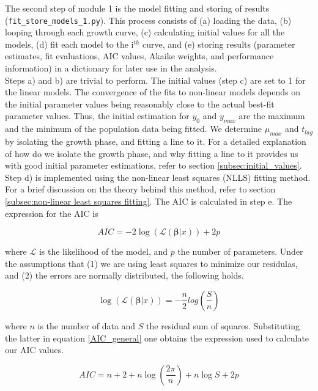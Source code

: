 \documentclass[titlepage,11pt]{article}
\begin{document}
\begin{linenumbers}
		The second step of module 1 is the model fitting and storing of results (\verb|fit_store_models_1.py|). This process consists of (a) loading the data, (b) looping through each growth curve, (c) calculating initial values for all the models, (d) fit each model to the i$ ^{th} $ curve, and (e) storing results (parameter estimates, fit evaluations, AIC values, Akaike weights, and performance information) in a dictionary for later use in the analysis. \\
		Steps a) and b) are trivial to perform. The initial values (step c) are set to 1 for the linear models. The convergence of the fits to non-linear models depends on the initial parameter values being reasonably close to the actual best-fit parameter values. Thus, the initial estimation for $ y_{0} $ and $ y_{max} $ are the maximum and the minimum of the population data being fitted. We determine $ \mu_{max} $ and $ t_{lag} $ by isolating the growth phase, and fitting a line to it. For a detailed explanation of how do we isolate the growth phase, and why fitting a line to it provides us with good initial parameter estimations, refer to section \ref{subsec:initial_values}. Step d) is implemented using the non-linear least squares (NLLS) fitting method. For a brief discussion on the theory behind this method, refer to section \ref{subsec:non-linear least squares fitting}. The AIC is calculated in step e. The expression for the AIC is
		\begin{linenomath*}
			\begin{equation}
			AIC = -2\log\left(\mathcal{L}(\boldsymbol{\beta}|x)\right) + 2p
			\label{AIC_general}
			\end{equation}
		\end{linenomath*}
		
		where $ \mathcal{L} $ is the likelihood of the model, and $ p $ the number of parameters. Under the assumptions that (1) we are using least squares to minimize our residulas, and (2) the errors are normally distributed, the following holds.
		\begin{linenomath*}
			\begin{equation}
			\log\left(\mathcal{L}(\boldsymbol{\beta}|x)\right) = -\frac{n}{2}log\left(\frac{S}{n}\right) 
			\end{equation}
		\end{linenomath*}
		
		where $ n $ is the number of data and $ S $ the residual sum of squares. Substituting the latter in equation \ref{AIC_general} one obtains the expression used to calculate our AIC values. \\
		\begin{linenomath*}
			\begin{equation}
			AIC = n + 2 + n \log\left(\frac{2\pi}{n}\right) + n\log S + 2 p
			\end{equation}
		\end{linenomath*}
		

\end{linenumbers}
\end{document}
